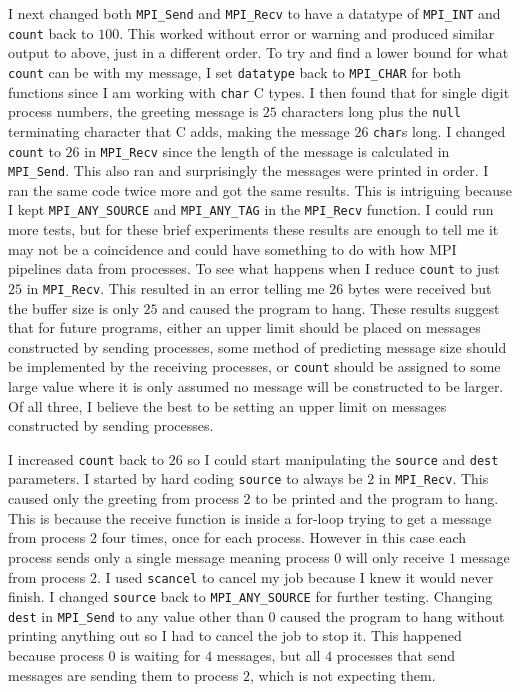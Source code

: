 \documentclass[11pt]{article}
\begin{document}
	I next changed both \texttt{MPI\_Send} and \texttt{MPI\_Recv} to have a datatype of \texttt{MPI\_INT} and \texttt{count} back to $100$. This worked without error or warning and produced similar output to above, just in a different order. To try and find a lower bound for what \texttt{count} can be with my message, I set \texttt{datatype} back to \texttt{MPI\_CHAR} for both functions since I am working with \texttt{char} C types. I then found that for single digit process numbers, the greeting message is $25$ characters long plus the \texttt{null} terminating character that C adds, making the message $26$ \texttt{char}s long. I changed \texttt{count} to $26$ in \texttt{MPI\_Recv} since the length of the message is calculated in \texttt{MPI\_Send}. This also ran and surprisingly the messages were printed in order. I ran the same code twice more and got the same results. This is intriguing because I kept \texttt{MPI\_ANY\_SOURCE} and \texttt{MPI\_ANY\_TAG} in the \texttt{MPI\_Recv} function. I could run more tests, but for these brief experiments these results are enough to tell me it may not be a coincidence and could have something to do with how MPI pipelines data from processes. To see what happens when I reduce \texttt{count} to just $25$ in \texttt{MPI\_Recv}. This resulted in an error telling me $26$ bytes were received but the buffer size is only $25$ and caused the program to hang. These results suggest that for future programs, either an upper limit should be placed on messages constructed by sending processes, some method of predicting message size should be implemented by the receiving processes, or \texttt{count} should be assigned to some large value where it is only assumed no message will be constructed to be larger. Of all three, I believe the best to be setting an upper limit on messages constructed by sending processes.
	
	I increased \texttt{count} back to $26$ so I could start manipulating the \texttt{source} and \texttt{dest} parameters. I started by hard coding \texttt{source} to always be $2$ in \texttt{MPI\_Recv}. This caused only the greeting from process $2$ to be printed and the program to hang. This is because the receive function is inside a for-loop trying to get a message from process $2$ four times, once for each process. However in this case each process sends only a single message meaning process $0$ will only receive $1$ message from process $2$. I used \texttt{scancel} to cancel my job because I knew it would never finish. I changed \texttt{source} back to \texttt{MPI\_ANY\_SOURCE} for further testing. Changing \texttt{dest} in \texttt{MPI\_Send} to any value other than $0$ caused the program to hang without printing anything out so I had to cancel the job to stop it. This happened because process $0$ is waiting for $4$ messages, but all $4$ processes that send messages are sending them to process $2$, which is not expecting them.
	
\end{document}
